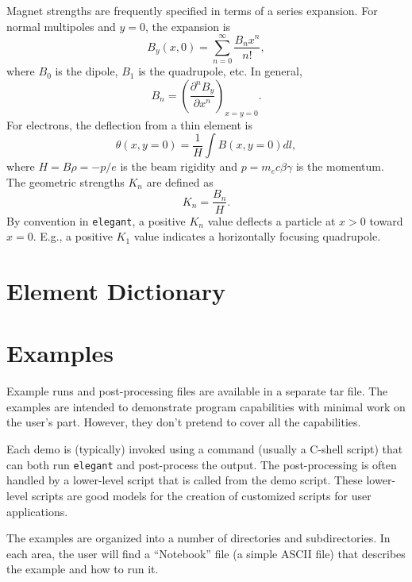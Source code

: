 \documentclass[11pt]{article}
\begin{document}
Magnet strengths are frequently specified in terms of a series expansion.
For normal multipoles and $y=0$, the expansion is \cite{MAD}
\begin{equation}
B_y(x,0)= \sum_{n=0}^\infty \frac{B_n x^n}{n!},
\end{equation}
where $B_0$ is the dipole, $B_1$ is the quadrupole, etc.
In general,
\begin{equation}
B_n = \left(\frac{\partial^n B_y}{\partial x^n}\right)_{x=y=0}.
\end{equation}
For electrons, the deflection from a thin element is
\begin{equation}
\theta(x,y=0) = \frac{1}{H} \int B(x,y=0) dl,
\end{equation}
where $H = B\rho = -p/e$ is the beam rigidity and $p=m_e c \beta\gamma$ is the momentum.
The geometric strengths $K_n$ are defined as
\begin{equation}
K_n = \frac{B_n}{H}.
\end{equation}
By convention in {\tt elegant}, a positive $K_n$ value deflects a particle at $x>0$ toward $x=0$.
E.g., a positive $K_1$ value indicates a horizontally focusing quadrupole.

\newpage
\section{Element Dictionary}


\newpage
\section{Examples}

Example runs and post-processing files are available in a separate tar file.
The examples are intended to
demonstrate program capabilities with minimal work on the user's part.
However, they don't pretend to cover all the capabilities.

Each demo is (typically) invoked using a command (usually a C-shell
script) that can both run {\tt elegant} and post-process the output.
The post-processing is often handled by a lower-level script that is
called from the demo script.  These lower-level scripts are good
models for the creation of customized scripts for user applications.

The examples are organized into a number of directories and subdirectories.
In each area, the user will find a ``Notebook'' file (a simple ASCII file) that describes 
the example and how to run it.
\end{document}
